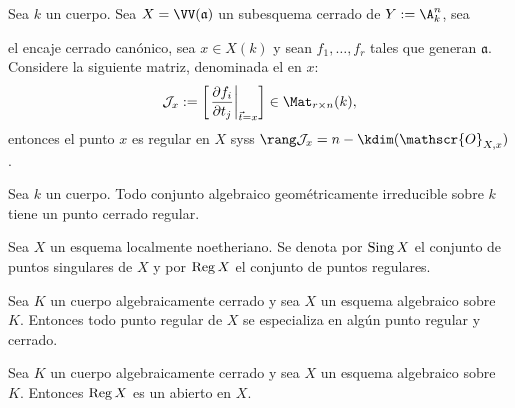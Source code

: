 \begin{thmi}
	Sea $k$ un cuerpo.
	Sea $X = \VV(\mathfrak{a})$ un subesquema cerrado de $Y := \A^n_k$, sea 
	el encaje cerrado canónico, sea $x \in X(k)$ y sean $f_1, \dots, f_r$ tales que generan $\mathfrak{a}$.
	Considere la siguiente matriz, denominada el  en $x$:
	$$ \mathcal{J}_x := \left[ \left. \frac{\partial f_i}{\partial t_j} \right|_{\vec t = x} \right] \in \Mat_{r\times n}(k), $$
	entonces el punto $x$ es regular en $X$ syss $\rang \mathcal{J}_x = n - \kdim(\mathscr{O}_{X, x})$.
\end{thmi}

\begin{thm}\label{thm:geo_irred_has_reg_clpt}
	Sea $k$ un cuerpo.
	Todo conjunto algebraico geométricamente irreducible sobre $k$ tiene un punto cerrado regular.
\end{thm}

\begin{mydef}
	Sea $X$ un esquema localmente noetheriano.
	Se denota por $\operatorname{Sing} X$ el conjunto de puntos singulares de $X$ y por $\operatorname{Reg} X$ el conjunto de puntos regulares.
\end{mydef}

\begin{lem}\label{lem:regular_pts_speto_closed_reg}
	Sea $K$ un cuerpo algebraicamente cerrado y sea $X$ un esquema algebraico sobre $K$.
	Entonces todo punto regular de $X$ se especializa en algún punto regular y cerrado.
\end{lem}
\begin{prop}
	Sea $K$ un cuerpo algebraicamente cerrado y sea $X$ un esquema algebraico sobre $K$.
	Entonces $\operatorname{Reg} X$ es un abierto en $X$.
\end{prop}

